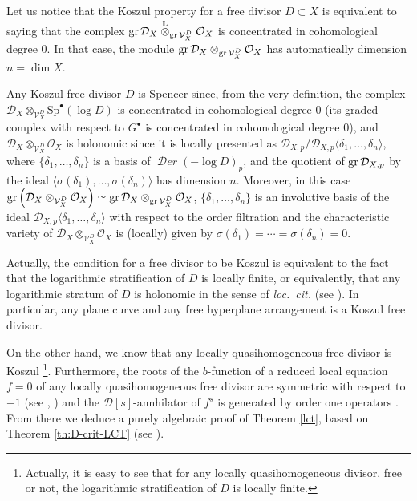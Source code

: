\documentclass[12pt]{article}
\newcommand{\Lotimes}{\stackrel{\mathbb{L}}{\otimes}}
\DeclareMathOperator{\gr}{\rm gr}
\DeclareMathOperator{\fDer}{\mathcal{D}\mathit{er}}
\newcommand{\OO}{\mathcal{O}}
\newcommand{\DD}{\mathcal{D}}
\newcommand{\VV}{\mathcal{V}}
\newcommand{\Sp}{{\mathrm{Sp}}}
\newcommand{\cO}{\OO}
\begin{document}
Let us notice that the Koszul property for a free divisor $D\subset X$ is equivalent to saying that the complex  $\gr \DD_X \Lotimes_{\gr\VV_X^D} \OO_X$ is concentrated in cohomological degree $0$. In that case, the module $\gr \DD_X \otimes_{\gr \VV_X^D} \OO_X$ has automatically dimension $n=\dim X$.

Any Koszul free divisor $D$ is Spencer since, from the very definition, the complex $\DD_X \otimes_{\VV_X^D}\Sp^\bullet(\log D)$ is concentrated in cohomological degree $0$ (its graded complex with respect to $G^\bullet$ is concentrated in cohomological degree $0$), and $\DD_X\otimes_{\VV_X^D} \cO_X$ is holonomic since it is locally presented as $\DD_{X,p}/\DD_{X,p}\langle \delta_1,\dots,\delta_n\rangle$, where $\{\delta_1,\dots,\delta_n\}$ is a basis of $\fDer(-\log D)_p$, and the quotient of $\gr \DD_{X,p}$ by the ideal $\langle
\sigma(\delta_1),\dots,\sigma(\delta_n)\rangle$ has dimension $n$. Moreover, in this case $\gr \left( \DD_X\otimes_{\VV_X^D} \cO_X \right) \simeq  \gr \DD_X \otimes_{\gr \VV_X^D} \OO_X$, $\{\delta_1,\dots,\delta_n\}$ is an involutive basis of the ideal $\DD_{X,p}\langle \delta_1,\dots,\delta_n\rangle$ with respect to the order filtration and the characteristic variety of $\DD_X\otimes_{\VV_X^D} \cO_X$ is (locally) given by $\sigma(\delta_1)=\cdots=\sigma(\delta_n)=0$.
\medskip

Actually, the condition for a free divisor to be Koszul is equivalent to the fact that the logarithmic stratification of $D$ \cite[\S 3]{Saito-80} is locally finite, or equivalently, that any logarithmic stratum of $D$ is holonomic in the sense of {\em loc.~cit.}  (see \cite[Theorem (7.4)]{gmns}). In particular, any plane curve and any free hyperplane arrangement is a Koszul free divisor.

On the other hand, we know that any locally quasihomogeneous free divisor is Koszul \cite{cal_na_stek}\footnote{Actually, it is easy to see that for any locally quasihomogeneous divisor, free or not, the logarithmic stratification of $D$ is locally finite.}. Furthermore, the roots of the $b$-function of a reduced local equation $f=0$ of any locally quasihomogeneous free divisor are symmetric with respect to $-1$ (see \cite[Theorem 5.6]{cal_na_comp}, \cite[Corollary (4.2)]{nar_symmetry_BS}) and the $\DD[s]$-annhilator of $f^s$ is generated by order one operators \cite[Corollary 5.8]{cal_na_comp}. From there we deduce a purely algebraic proof of Theorem \ref{lct}, based on Theorem \ref{th:D-crit-LCT} (see \cite[Corollary (4.5) and Remark (4.6)]{nar_symmetry_BS}).
\end{document}
